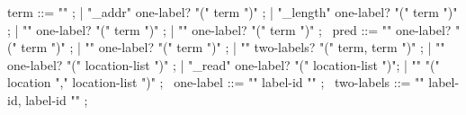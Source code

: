\begin{syntax}
  term ::= "\null" ;
        | "\base_addr" one-label? "(" term ")" ;
        | "\block_length" one-label? "(" term ")" ;
        | "\offset" one-label?  "(" term ")" ;
        | { "\allocation" } one-label?   "(" term ")" ;
       \
  pred ::=  "\allocable" one-label? "(" term ")" ;
       |  "\freeable" one-label? "(" term ")" ;
       | "\fresh"   two-labels? "(" term, term ")" ;
       | "\valid"  one-label?  "(" location-list ")" ;
       | "\valid_read"  one-label? "(" location-list ")";
       | "\separated" "(" location "," location-list ")" ;
       \
  one-label ::= "{" label-id "}" ;
       \
  two-labels ::= "{" label-id, label-id "}" ;
\end{syntax}

